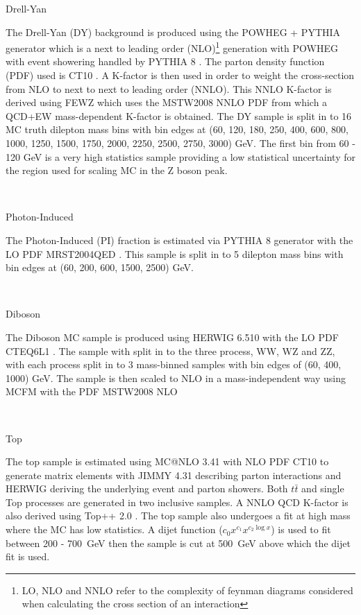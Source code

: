    {\bf\raggedright Drell-Yan}

   {\raggedright The Drell-Yan (DY) background is produced using the POWHEG + PYTHIA generator which is a next to leading order (NLO)\footnote{LO, NLO and NNLO refer to the complexity of feynman diagrams considered when calculating the cross section of an interaction} generation with POWHEG \cite{Alioli:2010xd,Alioli:2008gx} with event showering handled by PYTHIA 8 \cite{Sjostrand:2007gs}. The parton density function (PDF) used is CT10 \cite{Lai:2010vv}. A K-factor is then used in order to weight the cross-section from NLO to next to next to leading order (NNLO). This NNLO K-factor is derived using FEWZ \cite{Gavin:2010az} which uses the MSTW2008 NNLO PDF \cite{Martin:2009iq} from which a QCD+EW mass-dependent K-factor is obtained. The DY sample is split in to 16 MC truth dilepton mass bins with bin edges at (60, 120, 180, 250, 400, 600, 800, 1000, 1250, 1500, 1750, 2000, 2250, 2500, 2750, 3000) GeV. The first bin from 60 - 120 GeV is a very high statistics sample providing a low statistical uncertainty for the region used for scaling MC in the Z boson peak.} \\


   {\bf\raggedright Photon-Induced}

   {\raggedright The Photon-Induced (PI) fraction is estimated via PYTHIA 8 \cite{Sjostrand:2007gs} generator with the LO PDF MRST2004QED \cite{Martin:2004dh}. This sample is split in to 5 dilepton mass bins with bin edges at (60, 200, 600, 1500, 2500) GeV.}\\


   {\bf\raggedright Diboson}

   {\raggedright The Diboson MC sample is produced using HERWIG 6.510 \cite{Corcella:2002jc} with the LO PDF CTEQ6L1 \cite{Pumplin:2002vw}. The sample with split in to the three process, WW, WZ and ZZ, with each process split in to 3 mass-binned samples with bin edges of (60, 400, 1000) GeV. The sample is then scaled to NLO in a mass-independent way using MCFM \cite{Campbell:2010ff} with the PDF MSTW2008 NLO \cite{Martin:2009iq}}\\

   {\bf\raggedright Top}

   {\raggedright The top sample is estimated using MC@NLO 3.41 \cite{Frixione:2008ym} with NLO PDF CT10 \cite{Lai:2010vv} to generate matrix elements with JIMMY 4.31 \cite{Butterworth:1996zw} describing parton interactions and HERWIG \cite{Corcella:2002jc} deriving the underlying event and parton showers. Both $t\bar{t}$ and single Top processes are generated in two inclusive samples. A NNLO QCD K-factor is also derived using Top++ 2.0 \cite{Czakon:2013goa,Cacciari:2011hy}. The top sample also undergoes a fit at high mass where the MC has low statistics. A dijet function ($c_{0}x^{c_{1}} x^{c_{2}\log{x}}$) is used to fit between 200 - 700~GeV then the sample is cut at 500~GeV above which the dijet fit is used.}


